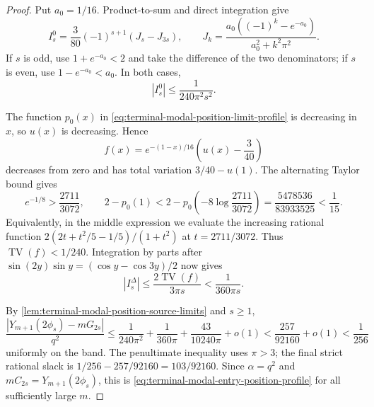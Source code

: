 \begin{proof}
Put $a_0=1/16$.  Product-to-sum and direct integration give
\begin{equation}
 I^0_s=\frac3{80}(-1)^{s+1}(J_s-J_{3s}),
 \qquad
 J_k=\frac{a_0((-1)^k-e^{-a_0})}{a_0^2+k^2\pi^2}.
 \label{eq:terminal-modal-position-constant-integral}
\end{equation}
If $s$ is odd, use $1+e^{-a_0}<2$ and take the difference of the two
denominators; if $s$ is even, use $1-e^{-a_0}<a_0$.  In both cases,
\begin{equation}
 |I^0_s|\le\frac1{240\pi^2s^2}.
 \label{eq:terminal-modal-position-constant-bound}
\end{equation}

The function $p_0(x)$ in
\eqref{eq:terminal-modal-position-limit-profile} is decreasing in $x$, so
$u(x)$ is decreasing.  Hence
\begin{equation}
 f(x)=e^{-(1-x)/16}\left(u(x)-\frac3{40}\right)
 \label{eq:terminal-modal-position-varying-amplitude}
\end{equation}
decreases from zero and has total variation $3/40-u(1)$.  The alternating
Taylor bound gives
\begin{equation}
 e^{-1/8}>\frac{2711}{3072},
 \qquad
 2-p_0(1)<2-p_0\!\left(-8\log\frac{2711}{3072}\right)
 =\frac{5478536}{83933525}<\frac1{15}.
 \label{eq:terminal-modal-position-variation-rational}
\end{equation}
Equivalently, in the middle expression we evaluate the increasing rational
function $2(2t+t^2/5-1/5)/(1+t^2)$ at
$t=2711/3072$.  Thus $\operatorname{TV}(f)<1/240$.
Integration by parts after
$\sin(2y)\sin y=(\cos y-\cos3y)/2$ now gives
\begin{equation}
 |I^\Delta_s|
 \le\frac{2\operatorname{TV}(f)}{3\pi s}
 <\frac1{360\pi s}.
 \label{eq:terminal-modal-position-varying-bound}
\end{equation}

By \cref{lem:terminal-modal-position-source-limits} and $s\ge1$,
\begin{equation}
 \frac{|Y_{m+1}(2\phi_s)-mG_{2s}|}{q^2}
 \le \frac1{240\pi^2}+\frac1{360\pi}
 +\frac{43}{10240\pi}+o(1)
 <\frac{257}{92160}+o(1)<\frac1{256}
 \label{eq:terminal-modal-position-final-ledger}
\end{equation}
uniformly on the band.  The penultimate inequality uses $\pi>3$; the final
strict rational slack is
$1/256-257/92160=103/92160$.  Since $\alpha=q^2$ and
$mC_{2s}=Y_{m+1}(2\phi_s)$, this is
\eqref{eq:terminal-modal-entry-position-profile} for all sufficiently large
$m$.
\end{proof}
